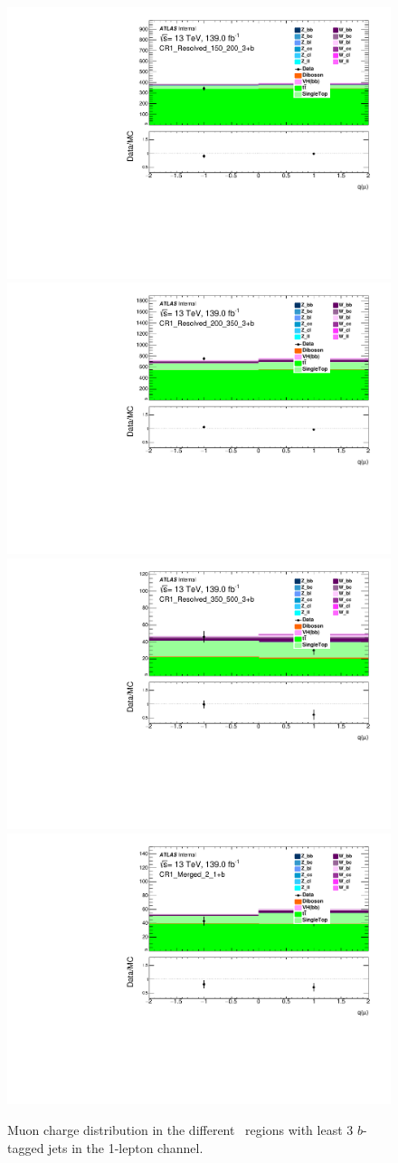 \begin{figure}[!htb]
    \includegraphics[width=0.46\linewidth]{chapters/c8/figures/1L/DataMC_MonoH_Nominal_CR1_Resolved_150_200_3+b_mu_charge.pdf}
    \includegraphics[width=0.46\linewidth]{chapters/c8/figures/1L/DataMC_MonoH_Nominal_CR1_Resolved_200_350_3+b_mu_charge.pdf}\\
    \includegraphics[width=0.46\linewidth]{chapters/c8/figures/1L/DataMC_MonoH_Nominal_CR1_Resolved_350_500_3+b_mu_charge.pdf}
    \includegraphics[width=0.46\linewidth]{chapters/c8/figures/1L/DataMC_MonoH_Nominal_CR1_Merged_2_1+b_mu_charge.pdf}
    \caption{Muon charge distribution in the different \met~regions with least 3 $b$-tagged jets in the 1-lepton channel.}
    \label{fig:data-mc-1l-mu-charge-3+b}
\end{figure}

